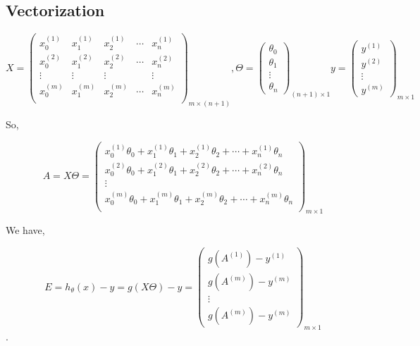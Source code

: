 \documentclass{article}
\begin{document}
\subsection{Vectorization}
\begin{equation*}
X=
\left(\begin{array}{ccccc}
x^{(1)}_0 & x^{(1)}_1 & x^{(1)}_2 & \cdots & x^{(1)}_n \\
x^{(2)}_0 & x^{(2)}_1 & x^{(2)}_2 & \cdots & x^{(2)}_n \\
\vdots & \vdots & \vdots &          &\vdots \\
x^{(m)}_0 & x^{(m)}_1 & x^{(m)}_2 & \cdots & x^{(m)}_n \\
\end{array}
\right)_{m\times{(n+1)}},
\Theta =
\left(\begin{array}{c}
\theta_0\\
\theta_1\\
\vdots\\
\theta_n
\end{array}
\right)_{(n+1)\times 1}
y =
\left(\begin{array}{c}
y^{(1)}\\
y^{(2)}\\
\vdots\\
y^{(m)}
\end{array}
\right)_{m\times 1}
\end{equation*}

So,

\begin{displaymath}
A=X\Theta=
\left(\begin{array}{c}
x^{(1)}_0\theta_0 + x^{(1)}_1 \theta_1 + x^{(1)}_2\theta_2 + \cdots + x^{(1)}_n\theta_n \\
x^{(2)}_0\theta_0 + x^{(2)}_1\theta_1 + x^{(2)}_2\theta_2 + \cdots + x^{(2)}_n\theta_n \\
\vdots  \\
x^{(m)}_0\theta_0 + x^{(m)}_1\theta_1 + x^{(m)}_2\theta_2 + \cdots + x^{(m)}_n\theta_n \\
\end{array}
\right)_{m\times 1}
\end{displaymath}

We have,

\begin{displaymath}
E=h_\theta(x)-y=g(X\Theta)-y=
\left(\begin{array}{c}
g(A^{(1)})-y^{(1)}\\
g(A^{(m)})-y^{(m)}\\
\vdots\\
g(A^{(m)})-y^{(m)}
\end{array}
\right)_{m\times 1}
\end{displaymath}.
\end{document}

